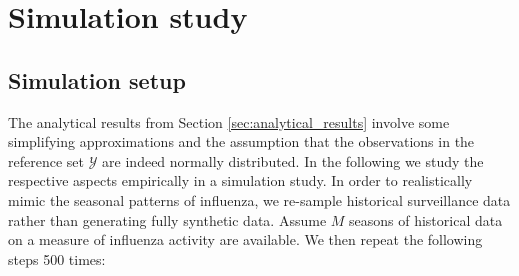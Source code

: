 \documentclass{article}
\begin{document}
\section{Simulation study}
\label{sec:simulation}

\subsection{Simulation setup}
\label{subsec:simulation_setup}

The analytical results from Section \ref{sec:analytical_results} involve some simplifying approximations and the assumption that the observations in the reference set $\mathcal{Y}$ are indeed normally distributed. In the following we study the respective aspects empirically in a simulation study. In order to realistically mimic the seasonal patterns of influenza, we re-sample historical surveillance data rather than generating fully synthetic data. Assume $M$ seasons of historical data on a measure of influenza activity are available. We then repeat the following steps 500 times:
\end{document}
